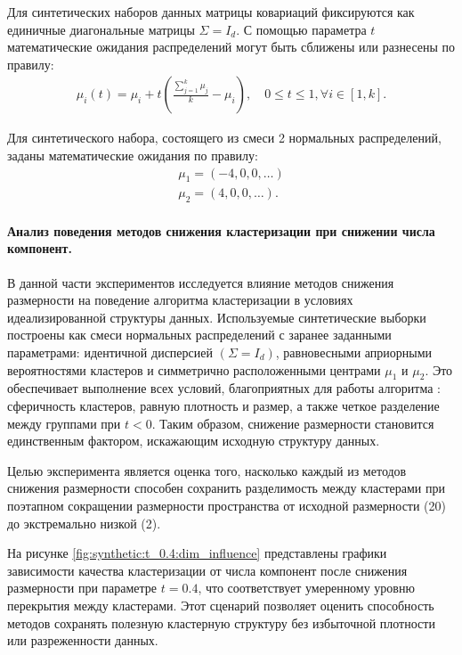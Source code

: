             Для синтетических наборов данных матрицы ковариаций фиксируются как единичные диагональные матрицы \(\Sigma = I_d\).
            С помощью параметра \(t\) математические ожидания распределений могут быть сближены или разнесены по правилу:
            \begin{gather*}
                \mu_i(t) = \mu_i + t( \frac{\sum_{j=1}^{k}\mu_j}{k} - \mu_i), \quad 0 \leq t \leq 1, \forall i \in [1, k].
            \end{gather*}

            Для синтетического набора, состоящего из смеси 2 нормальных распределений, заданы математические ожидания по правилу:
            \begin{gather*}
                \mu_1 = (-4, 0 , 0, \dots) \\
                \mu_2 = (4, 0, 0, \dots).
            \end{gather*}

            \paragraph{Анализ поведения методов снижения кластеризации при снижении числа компонент.}
                В данной части экспериментов исследуется влияние методов снижения размерности на поведение алгоритма кластеризации \kmeans{} в условиях идеализированной структуры данных. Используемые синтетические выборки построены как смеси нормальных распределений с заранее заданными параметрами: идентичной дисперсией \((\Sigma = I_d)\), равновесными априорными вероятностями кластеров и симметрично расположенными центрами \(\mu_1\) и \(\mu_2\). Это обеспечивает выполнение всех условий, благоприятных для работы алгоритма \kmeans{}: сферичность кластеров, равную плотность и размер, а также четкое разделение между группами при \(t < 0\). Таким образом, снижение размерности становится единственным фактором, искажающим исходную структуру данных.

                Целью эксперимента является оценка того, насколько каждый из методов снижения размерности способен сохранить разделимость между кластерами при поэтапном сокращении размерности пространства от исходной размерности (20) до экстремально низкой (2).

                На рисунке \ref{fig:synthetic:t_0.4:dim_influence} представлены графики зависимости качества кластеризации от числа компонент после снижения размерности при параметре \(t = 0.4\), что соответствует умеренному уровню перекрытия между кластерами. Этот сценарий позволяет оценить способность методов сохранять полезную кластерную структуру без избыточной плотности или разреженности данных.

